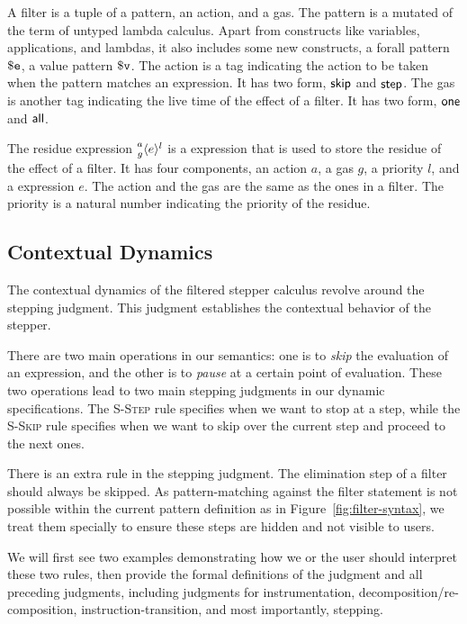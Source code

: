 A filter is a tuple of a pattern, an action, and a gas. The pattern
is a mutated of the term of untyped lambda calculus. Apart from constructs like
variables, applications, and lambdas, it also includes some new constructs, a
forall pattern \(\PatExpr\), a value pattern \(\PatValue\). The action is a tag indicating
the action to be taken when the pattern matches an expression. It has two
form, \(\ActSkip\) and \(\ActStep\). The gas is another tag indicating the
live time of the effect of a filter. It has two form, \(\GasOne\) and
\(\GasAll\).

The residue expression \(\Residue{a}{g}{l}{e}\) is a expression that is used to
store the residue of the effect of a filter. It has four components, an action
\(a\), a gas \(g\), a priority \(l\), and a expression \(e\). The action and the
gas are the same as the ones in a filter. The priority is a natural number
indicating the priority of the residue.

\subsection{Contextual Dynamics}

The contextual dynamics of the filtered stepper calculus revolve around the
stepping judgment. This judgment establishes the contextual behavior of the
stepper.

There are two main operations in our semantics: one is to \emph{skip} the
evaluation of an expression, and the other is to \emph{pause} at a certain point
of evaluation. These two operations lead to two main stepping judgments in our
dynamic specifications. The \textsc{S-Step} rule specifies when we want to stop
at a step, while the \textsc{S-Skip} rule specifies when we want to skip over
the current step and proceed to the next ones.

There is an extra rule in the stepping judgment. The elimination step of a
filter should always be skipped. As pattern-matching against the filter
statement is not possible within the current pattern definition as in
Figure~\ref{fig:filter-syntax}, we treat them specially to ensure these steps
are hidden and not visible to users.

We will first see two examples demonstrating how we or the user should interpret
these two rules, then provide the formal definitions of the judgment and all
preceding judgments, including judgments for instrumentation,
decomposition/re-composition, instruction-transition, and most importantly,
stepping.

